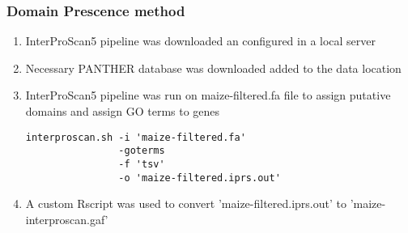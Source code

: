   \subsubsection{Domain Prescence method}
  \begin{enumerate}
    \item InterProScan5 pipeline was downloaded an configured in a local server
    \item Necessary PANTHER database was downloaded added to the data location
    \item InterProScan5 pipeline was run on maize-filtered.fa file to assign putative domains and assign GO terms to genes \\
    \begin{verbatim}
interproscan.sh -i 'maize-filtered.fa'
                -goterms
                -f 'tsv'
                -o 'maize-filtered.iprs.out'
    \end{verbatim}
    \item A custom Rscript was used to convert 'maize-filtered.iprs.out' to 'maize-interproscan.gaf'
  \end{enumerate}
